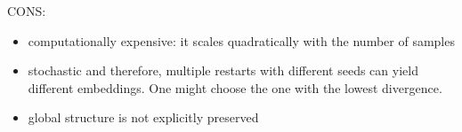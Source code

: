 \documentclass[journal, a4paper]{IEEEtran}
\begin{document}

CONS: 
\begin{itemize}
		\item computationally expensive: it scales quadratically with the number of samples
		\item stochastic and therefore, multiple restarts with different seeds can yield different embeddings. One might choose the one with the lowest divergence.
		\item global structure is not explicitly preserved
	\end{itemize}


%
%


\end{document}
